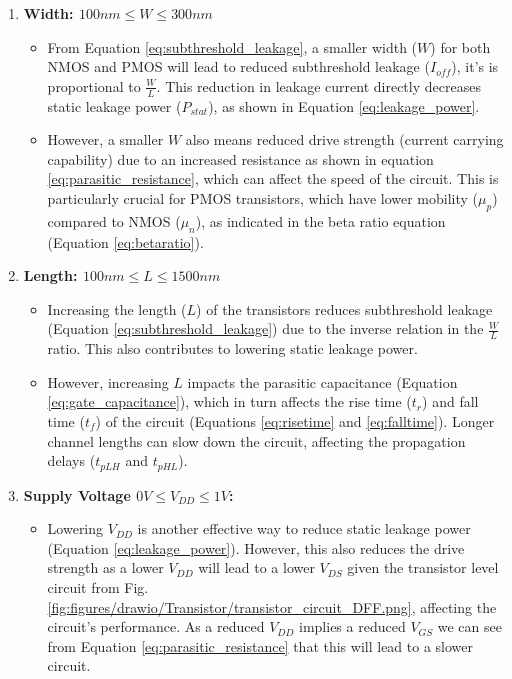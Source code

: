 \begin{enumerate}
    \item \textbf{Width: $100nm\leq W \leq 300nm$}
    \begin{itemize}
        \item From Equation \ref{eq:subthreshold_leakage}, a smaller width ($W$) for both NMOS and PMOS will lead to reduced subthreshold leakage (\(I_{off}\)), it's is proportional to $\frac{W}{L}$. This reduction in leakage current directly decreases static leakage power (\(P_{stat}\)), as shown in Equation \ref{eq:leakage_power}.
        \item However, a smaller $W$ also means reduced drive strength (current carrying capability) due to an increased resistance as shown in equation \ref{eq:parasitic_resistance}, which can affect the speed of the circuit. This is particularly crucial for PMOS transistors, which have lower mobility (\(\mu_p\)) compared to NMOS (\(\mu_n\)), as indicated in the beta ratio equation (Equation \ref{eq:betaratio}).
    \end{itemize}

    \item \textbf{Length: $100nm\leq L \leq 1500nm$}
    \begin{itemize}
        \item Increasing the length ($L$) of the transistors reduces subthreshold leakage (Equation \ref{eq:subthreshold_leakage}) due to the inverse relation in the $\frac{W}{L}$ ratio. This also contributes to lowering static leakage power.
        \item However, increasing $L$ impacts the parasitic capacitance (Equation \ref{eq:gate_capacitance}), which in turn affects the rise time ($t_r$) and fall time ($t_f$) of the circuit (Equations \ref{eq:risetime} and \ref{eq:falltime}). Longer channel lengths can slow down the circuit, affecting the propagation delays ($t_{pLH}$ and $t_{pHL}$).
    \end{itemize}


    \item \textbf{Supply Voltage $0V\leq V_{DD}\leq 1V$:}
    \begin{itemize}
        \item Lowering $V_{DD}$ is another effective way to reduce static leakage power (Equation \ref{eq:leakage_power}). However, this also reduces the drive strength as a lower $V_{DD}$ will lead to a lower $V_{DS}$ given the transistor level circuit from Fig. \ref{fig:figures/drawio/Transistor/transistor_circuit_DFF.png}, affecting the circuit's performance. As a reduced $V_{DD}$ implies a reduced $V_{GS}$ we can see from Equation \ref{eq:parasitic_resistance} that this will lead to a slower circuit.
    \end{itemize}


\end{enumerate}
